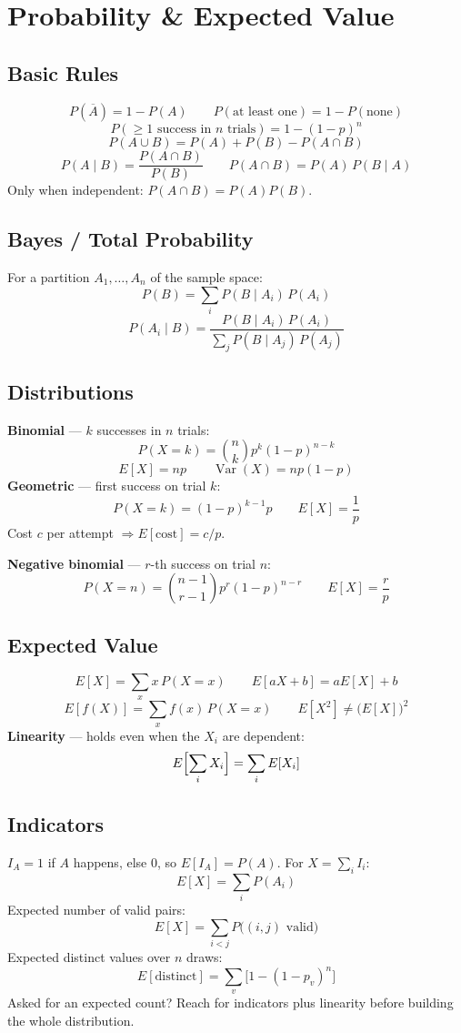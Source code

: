 \section{Probability \& Expected Value}

\subsection{Basic Rules}
\[P(\overline{A})=1-P(A)\qquad
  P(\text{at least one})=1-P(\text{none})\]
\[P(\ge 1\text{ success in }n\text{ trials})=1-(1-p)^n\]
\[P(A\cup B)=P(A)+P(B)-P(A\cap B)\]
\[P(A\mid B)=\frac{P(A\cap B)}{P(B)}\qquad
  P(A\cap B)=P(A)\,P(B\mid A)\]
\noindent Only when independent: $P(A\cap B)=P(A)P(B)$.

\subsection{Bayes / Total Probability}
\noindent For a partition $A_1,\dots,A_n$ of the sample space:
\[P(B)=\sum_i P(B\mid A_i)\,P(A_i)\]
\[P(A_i\mid B)=\frac{P(B\mid A_i)\,P(A_i)}{\sum_j P(B\mid A_j)\,P(A_j)}\]

\subsection{Distributions}
\noindent\textbf{Binomial} --- $k$ successes in $n$ trials:
\[P(X=k)=\binom{n}{k}p^k(1-p)^{n-k}\]
\[E[X]=np\qquad \operatorname{Var}(X)=np(1-p)\]
\noindent\textbf{Geometric} --- first success on trial $k$:
\[P(X=k)=(1-p)^{k-1}p\qquad E[X]=\frac{1}{p}\]
\noindent Cost $c$ per attempt $\Rightarrow E[\text{cost}]=c/p$.

\noindent\textbf{Negative binomial} --- $r$-th success on trial $n$:
\[P(X=n)=\binom{n-1}{r-1}p^r(1-p)^{n-r}\qquad E[X]=\frac{r}{p}\]

\subsection{Expected Value}
\[E[X]=\sum_x x\,P(X=x)\qquad E[aX+b]=aE[X]+b\]
\[E[f(X)]=\sum_x f(x)\,P(X=x)\qquad E[X^2]\neq\bigl(E[X]\bigr)^2\]
\noindent\textbf{Linearity} --- holds even when the $X_i$ are dependent:
\[E\Bigl[\sum_i X_i\Bigr]=\sum_i E[X_i]\]

\subsection{Indicators}
\noindent $I_A=1$ if $A$ happens, else $0$, so $E[I_A]=P(A)$. For
$X=\sum_i I_i$:
\[E[X]=\sum_i P(A_i)\]
\noindent Expected number of valid pairs:
\[E[X]=\sum_{i<j}P\bigl((i,j)\text{ valid}\bigr)\]
\noindent Expected distinct values over $n$ draws:
\[E[\text{distinct}]=\sum_v\bigl[1-(1-p_v)^n\bigr]\]
\noindent Asked for an expected count? Reach for indicators plus
linearity before building the whole distribution.

